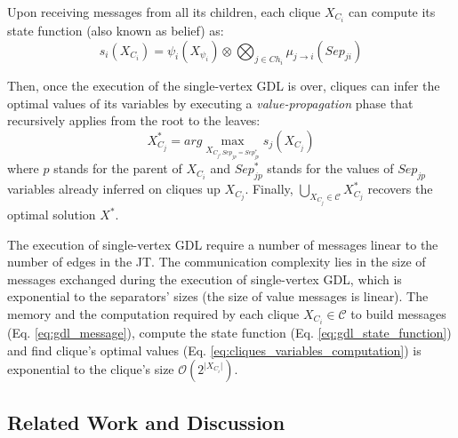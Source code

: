 \documentclass{aamas2012}
\begin{document}
\noindent Upon receiving messages from all its children, each clique $X_{C_i}$
can compute its state function (also known as belief) as:
\begin{equation}
s_i(X_{C_i}) = \psi_i(X_{\psi_i}) \otimes \bigotimes_{j \in Ch_i}
\mu_{j \rightarrow i}(Sep_{ji})
\label{eq:gdl_state_function}
\end{equation}

 
\noindent Then, once the execution of the single-vertex GDL is over, cliques can
infer the optimal values of its variables by executing a \emph{value-propagation}
phase that recursively applies from the root to the leaves: 
\begin{equation}
X^*_{C_j}= arg \max_{X_{C_j, Sep_{jp}= Sep^*_{jp}}} s_j(X_{C_j}) 
\label{eq:cliques_variables_computation}
\end{equation}
where $p$ stands for the
parent of $X_{C_i}$ and $Sep^*_{jp}$ stands for
the values of $Sep_{jp}$ variables already inferred on cliques up $X_{C_j}$.
Finally, $\bigcup_{X_{C_j} \in \mathcal{C}} X^*_{C_j}$ recovers the optimal
solution $X^*$.

The execution of single-vertex GDL require a number of
messages linear to the number of edges in the JT. The communication complexity lies in the size of messages exchanged
during the execution of single-vertex GDL, which is exponential to the
separators' sizes (the size of value messages is linear). 
The memory and the computation required by each clique $X_{C_i}\in
\mathcal{C}$ to build messages (Eq. \ref{eq:gdl_message}), compute the state
function (Eq. \ref{eq:gdl_state_function}) and find clique's optimal values (Eq.
\ref{eq:cliques_variables_computation}) is exponential to the clique's size
$\mathcal{O}(2^{\vert X_{C_i}\vert})$.

\subsection{Related Work and Discussion}
\end{document}
